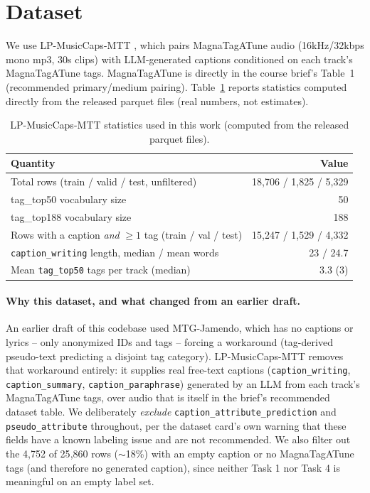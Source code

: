 \documentclass{article}
\begin{document}
\section{Dataset}
\label{sec:dataset}

We use LP-MusicCaps-MTT \citep{doh2023lpmusiccaps}, which pairs
MagnaTagATune \citep{law2009magnatagatune} audio (16kHz/32kbps mono mp3,
30s clips) with LLM-generated captions conditioned on each track's
MagnaTagATune tags. MagnaTagATune is directly in the course brief's
Table~1 (recommended primary/medium pairing). Table~\ref{tab:dataset}
reports statistics computed directly from the released parquet files (real
numbers, not estimates).

\begin{table}[H]
  \caption{LP-MusicCaps-MTT statistics used in this work (computed from the released parquet files).}
  \label{tab:dataset}
  \centering
  \begin{tabular}{lr}
    \toprule
    Quantity & Value \\
    \midrule
    Total rows (train / valid / test, unfiltered) & 18{,}706 / 1{,}825 / 5{,}329 \\
    tag\_top50 vocabulary size & 50 \\
    tag\_top188 vocabulary size & 188 \\
    Rows with a caption \emph{and} $\geq 1$ tag (train / val / test) & 15{,}247 / 1{,}529 / 4{,}332 \\
    \texttt{caption\_writing} length, median / mean words & 23 / 24.7 \\
    Mean \texttt{tag\_top50} tags per track (median) & 3.3 (3) \\
    \bottomrule
  \end{tabular}
\end{table}

\paragraph{Why this dataset, and what changed from an earlier draft.} An
earlier draft of this codebase used MTG-Jamendo, which has no captions or
lyrics -- only anonymized IDs and tags -- forcing a workaround (tag-derived
pseudo-text predicting a disjoint tag category). LP-MusicCaps-MTT removes
that workaround entirely: it supplies real free-text captions
(\texttt{caption\_writing}, \texttt{caption\_summary},
\texttt{caption\_paraphrase}) generated by an LLM from each track's
MagnaTagATune tags, over audio that is itself in the brief's recommended
dataset table. We deliberately \emph{exclude}
\texttt{caption\_attribute\_prediction} and \texttt{pseudo\_attribute}
throughout, per the dataset card's own warning that these fields have a
known labeling issue and are not recommended. We also filter out the
4{,}752 of 25{,}860 rows ($\sim$18\%) with an empty caption or no
MagnaTagATune tags (and therefore no generated caption), since neither
Task 1 nor Task 4 is meaningful on an empty label set.
\end{document}
